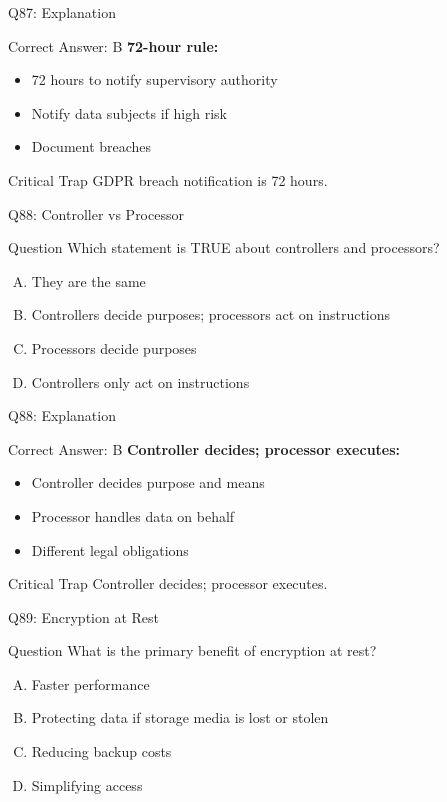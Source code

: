 \documentclass{beamer}
\begin{document}
	\begin{frame}{Q87: Explanation}
		\begin{block}{Correct Answer: B}
			\textbf{72-hour rule:}
			\begin{itemize}
				\item 72 hours to notify supervisory authority
				\item Notify data subjects if high risk
				\item Document breaches
			\end{itemize}
		\end{block}
		\begin{alertblock}{Critical Trap}
			GDPR breach notification is 72 hours.
		\end{alertblock}
	\end{frame}
	
	\begin{frame}{Q88: Controller vs Processor}
		\begin{block}{Question}
			Which statement is TRUE about controllers and processors?
		\end{block}
		\begin{enumerate}[(A)]
			\item They are the same
			\item Controllers decide purposes; processors act on instructions
			\item Processors decide purposes
			\item Controllers only act on instructions
		\end{enumerate}
	\end{frame}
	
	\begin{frame}{Q88: Explanation}
		\begin{block}{Correct Answer: B}
			\textbf{Controller decides; processor executes:}
			\begin{itemize}
				\item Controller decides purpose and means
				\item Processor handles data on behalf
				\item Different legal obligations
			\end{itemize}
		\end{block}
		\begin{alertblock}{Critical Trap}
			Controller decides; processor executes.
		\end{alertblock}
	\end{frame}
	
	\begin{frame}{Q89: Encryption at Rest}
		\begin{block}{Question}
			What is the primary benefit of encryption at rest?
		\end{block}
		\begin{enumerate}[(A)]
			\item Faster performance
			\item Protecting data if storage media is lost or stolen
			\item Reducing backup costs
			\item Simplifying access
		\end{enumerate}
	\end{frame}
	
\end{document}
